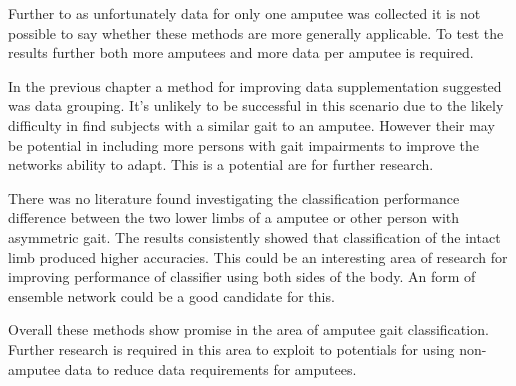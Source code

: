 Further to as unfortunately data for only one amputee was collected it is not possible to say whether these methods are more generally applicable. To test the results further both more amputees and more data per amputee is required. 

In the previous chapter a method for improving data supplementation suggested was data grouping. It's unlikely to be successful in this scenario due to the likely difficulty in find subjects with a similar gait to an amputee. However their may be potential in including more persons with gait impairments to improve the networks ability to adapt. This is a potential are for further research.

There was no literature found investigating the classification performance difference between the two lower limbs of a amputee or other person with asymmetric gait. The results consistently showed that classification of the intact limb produced higher accuracies. This could be an interesting area of research for improving performance of classifier using both sides of the body. An form of ensemble network could be a good candidate for this.

Overall these methods show promise in the area of amputee gait classification. Further research is required in this area to exploit to potentials for using non-amputee data to reduce data requirements for amputees.


